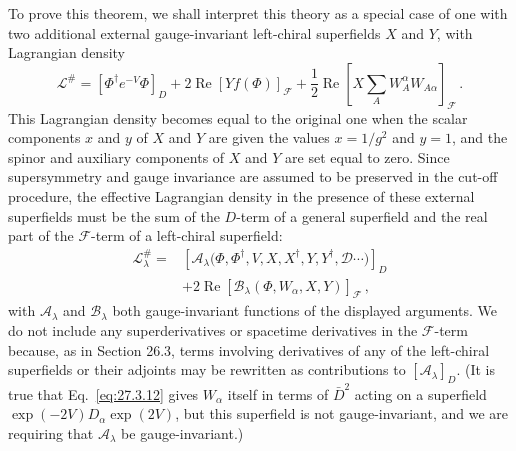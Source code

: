 To prove this theorem, we shall interpret this theory as a special case of
one with two additional external gauge-invariant left-chiral superfields
\(X\) and \(Y\), with Lagrangian density
\begin{equation}
  \mathcal{L}^{\#}
  =
  \left[\Phi^\dagger e^{-V}\Phi\right]_D
  +2\operatorname{Re}\left[Yf(\Phi)\right]_{\mathcal{F}}
  +\frac12\operatorname{Re}
  \left[
    X\sum_A W_A^\alpha W_{A\alpha}
  \right]_{\mathcal{F}}\,.
  \tag{27.6.4}\label{eq:27.6.4}
\end{equation}
This Lagrangian density becomes equal to the original one when the scalar
components \(x\) and \(y\) of \(X\) and \(Y\) are given the values
\(x=1/g^2\) and \(y=1\), and the spinor and auxiliary components of \(X\)
and \(Y\) are set equal to zero. Since supersymmetry and gauge invariance are
assumed to be preserved in the cut-off procedure, the effective Lagrangian
density in the presence of these external superfields must be the sum of the
\(D\)-term of a general superfield and the real part of the
\(\mathcal{F}\)-term of a left-chiral superfield:
\begin{equation}
  \begin{aligned}
  \mathcal{L}^{\#}_\lambda
  ={}&
  \left[
    \mathcal{A}_\lambda
    \bigl(\Phi,\Phi^\dagger,V,X,X^\dagger,Y,Y^\dagger,
    \mathcal{D}\cdots\bigr)
  \right]_D
  \\
  &+2\operatorname{Re}
  \left[
    \mathcal{B}_\lambda(\Phi,W_\alpha,X,Y)
  \right]_{\mathcal{F}}\,,
  \end{aligned}
  \tag{27.6.5}\label{eq:27.6.5}
\end{equation}
with \(\mathcal{A}_\lambda\) and \(\mathcal{B}_\lambda\) both
gauge-invariant functions of the displayed arguments. We do not include any
superderivatives or spacetime derivatives in the \(\mathcal{F}\)-term
because, as in Section 26.3, terms involving derivatives of any of the
left-chiral superfields or their adjoints may be rewritten as contributions
to \([\mathcal{A}_\lambda]_D\). (It is true that Eq.~\eqref{eq:27.3.12}
gives \(W_\alpha\) itself in terms of \(\bar D^2\) acting on a
superfield \(\exp(-2V)D_\alpha\exp(2V)\), but this superfield is not
gauge-invariant, and we are requiring that \(\mathcal{A}_\lambda\) be
gauge-invariant.)

